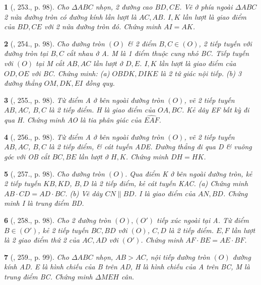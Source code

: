\documentclass{article}
\newtheorem{baitoan}{}
\begin{document}
\begin{baitoan}[\cite{Binh_Toan_9_tap_2}, 253., p. 98]
	Cho $\Delta ABC$ nhọn, 2 đường cao $BD,CE$. Vẽ ở phía ngoài $\Delta ABC$ 2 nửa đường tròn có đường kính lần lượt là $AC,AB$. $I,K$ lần lượt là giao điểm của $BD,CE$ với 2 nửa đường tròn đó. Chứng minh $AI = AK$.
\end{baitoan}

\begin{baitoan}[\cite{Binh_Toan_9_tap_2}, 254., p. 98]
	Cho đường tròn $(O)$ \& 2 điểm $B,C\in(O)$, 2 tiếp tuyến với đường tròn tại $B,C$ cắt nhau ở A. M là 1 điểm thuộc cung nhỏ BC. Tiếp tuyến với $(O)$ tại M cắt $AB,AC$ lần lượt ở $D,E$. $I,K$ lần lượt là giao điểm của $OD,OE$ với BC. Chứng minh: (a) $OBDK,DIKE$ là 2 tứ giác nội tiếp. (b) 3 đường thẳng $OM,DK,EI$ đồng quy.
\end{baitoan}

\begin{baitoan}[\cite{Binh_Toan_9_tap_2}, 255., p. 98]
	Từ điểm A ở bên ngoài đường tròn $(O)$, vẽ 2 tiếp tuyến $AB,AC$, $B,C$ là 2 tiếp điểm. H là giao điểm của $OA,BC$. Kẻ dây EF bất kỳ đi qua H. Chứng minh AO là tia phân giác của $\widehat{EAF}$.
\end{baitoan}

\begin{baitoan}[\cite{Binh_Toan_9_tap_2}, 256., p. 98]
	Từ điểm A ở bên ngoài đường tròn $(O)$, vẽ 2 tiếp tuyến $AB,AC$, $B,C$ là 2 tiếp điểm, \& cát tuyến ADE. Đường thẳng đi qua D \& vuông góc với OB cắt $BC,BE$ lần lượt ở $H,K$. Chứng minh $DH = HK$.
\end{baitoan}

\begin{baitoan}[\cite{Binh_Toan_9_tap_2}, 257., p. 98]
	Cho đường tròn $(O)$. Qua điểm K ở bên ngoài đường tròn, kẻ 2 tiếp tuyến $KB,KD$, $B,D$ là 2 tiếp điểm, kẻ cát tuyến KAC. (a) Chứng minh $AB\cdot CD = AD\cdot BC$. (b) Vẽ dây $CN\parallel BD$. I là giao điểm của $AN,BD$. Chứng minh I là trung điểm BD.
\end{baitoan}

\begin{baitoan}[\cite{Binh_Toan_9_tap_2}, 258., p. 98]
	Cho 2 đường tròn $(O),(O')$ tiếp xúc ngoài tại A. Từ điểm $B\in(O')$, kẻ 2 tiếp tuyến $BC,BD$ với $(O)$, $C,D$ là 2 tiếp điểm. $E,F$ lần lượt là 2 giao điểm thứ 2 của $AC,AD$ với $(O')$. Chứng minh $AF\cdot BE = AE\cdot BF$.
\end{baitoan}

\begin{baitoan}[\cite{Binh_Toan_9_tap_2}, 259., p. 99]
	Cho $\Delta ABC$ nhọn, $AB > AC$, nội tiếp đường tròn $(O)$ đường kính AD. E là hình chiếu của B trên AD, H là hình chiếu của A trên BC, M là trung điểm BC. Chứng minh $\Delta MEH$ cân.
\end{baitoan}
\end{document}
